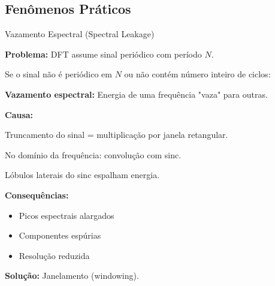 
\subsection{Fenômenos Práticos}

\begin{frame}{Vazamento Espectral (Spectral Leakage)}

\textbf{Problema:} DFT assume sinal periódico com período $N$.

Se o sinal não é periódico em $N$ ou não contém número inteiro de ciclos:

\textbf{Vazamento espectral:} Energia de uma frequência "vaza" para outras.

\vspace{0.1cm}

\textbf{Causa:}

Truncamento do sinal = multiplicação por janela retangular.

No domínio da frequência: convolução com sinc.

Lóbulos laterais do sinc espalham energia.

\vspace{0.1cm}

\textbf{Consequências:}

\begin{itemize}
\item Picos espectrais alargados
\item Componentes espúrias
\item Resolução reduzida
\end{itemize}

\textbf{Solução:} Janelamento (windowing).

\end{frame}


